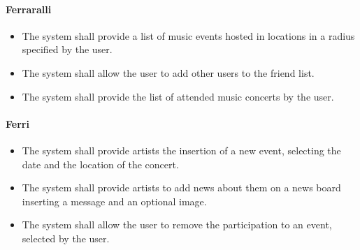 \documentclass[11pt,a4paper]{article}
\begin{document}
\paragraph{Ferraralli}
\begin{itemize}
\item The system shall provide a list of music events hosted in locations in a radius specified by the user.
\item The system shall allow the user to add other users to the friend list.
\item The system shall provide the list of attended music concerts by the user.
\end{itemize}
\paragraph{Ferri}
\begin{itemize}
\item The system shall provide artists the insertion of a new event, selecting the date and the location of the concert.
\item The system shall provide artists to add news about them on a news board inserting a message and an optional image.
\item The system shall allow the user to remove the participation to an event, selected by the user.
\end{itemize}
\end{document}
